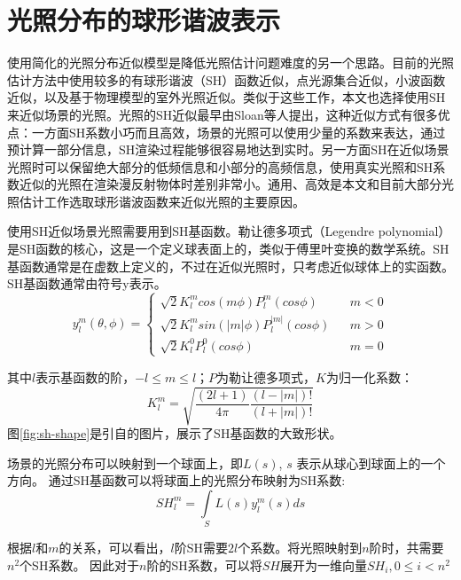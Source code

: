 \section{光照分布的球形谐波表示}
使用简化的光照分布近似模型是降低光照估计问题难度的另一个思路。目前的光照估计方法中使用较多的有球形谐波（SH）函数近似，点光源集合近似，小波函数近似，以及基于物理模型的室外光照近似。类似于这些工作，本文也选择使用SH来近似场景的光照。光照的SH近似最早由Sloan等人\cite{sloan2002precomputed}提出，这种近似方式有很多优点：一方面SH系数小巧而且高效，场景的光照可以使用少量的系数来表达，通过预计算一部分信息，SH渲染过程能够很容易地达到实时。另一方面SH在近似场景光照时可以保留绝大部分的低频信息和小部分的高频信息，使用真实光照和SH系数近似的光照在渲染漫反射物体时差别非常小。通用、高效是本文和目前大部分光照估计工作选取球形谐波函数来近似光照的主要原因。

使用SH近似场景光照需要用到SH基函数。勒让德多项式（Legendre polynomial）是SH函数的核心，这是一个定义球表面上的，类似于傅里叶变换的数学系统。SH基函数通常是在虚数上定义的，不过在近似光照时，只考虑近似球体上的实函数。SH基函数通常由符号y表示。
\begin{equation}
y^m_l(\theta, \phi)=\left\{
    \begin{array}{lcl}
        \sqrt{2}K^m_lcos(m\phi)P^m_l(cos\phi) & & {m<0}\\
        \sqrt{2}K^m_lsin(|m|\phi)P^|m|_l(cos\phi) & & {m>0}\\
        \sqrt{2}K^0_lP^0_l(cos\phi) & & {m=0}
    \end{array} \right. 
\end{equation}

其中$l$表示基函数的阶，$-l \leq m \leq l$；$P$为勒让德多项式，$K$为归一化系数：
\begin{equation}
    K^m_l=\sqrt{\frac{(2l+1)}{4\pi}\frac{(l-|m|)!}{(l+|m|)!}}
\end{equation}
图\ref{fig:sh-shape}是引自\cite{green2003spherical}的图片，展示了SH基函数的大致形状。



场景的光照分布可以映射到一个球面上，即$L(s)$, $s$ 表示从球心到球面上的一个方向。
通过SH基函数可以将球面上的光照分布映射为SH系数:
\begin{equation}
    SH^m_l = \int\limits_{S}L(s)y^m_l(s)ds
\end{equation}

根据$l$和$m$的关系，可以看出，$l$阶SH需要$2l$个系数。将光照映射到$n$阶时，共需要$n^2$个SH系数。
因此对于$n$阶的SH系数，可以将$SH$展开为一维向量$SH_i, 0 \leq i < n^2$


